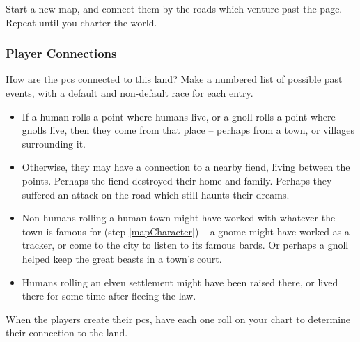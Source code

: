 \begin{multicols}{2}
\begin{itemize}
  Start a new map, and connect them by the roads which venture past the page.
  Repeat until you charter the world.
\end{itemize}

\bigLine

\subsubsection{Player Connections}

How are the \glspl{pc} connected to this land?
Make a numbered list of possible past events, with a default and non-default race for each entry.

\begin{itemize}
  \item
  If a human rolls a point where humans live, or a gnoll rolls a point where gnolls live, then they come from that place -- perhaps from a town, or \glspl{village} surrounding it.
  \item
  Otherwise, they may have a connection to a nearby fiend, living between the points.
  Perhaps the fiend destroyed their home and family.
  Perhaps they suffered an attack on the road which still haunts their dreams.
  \item
  Non-humans rolling a human town might have worked with whatever the town is famous for (step \vref{mapCharacter}) -- a gnome might have worked as a tracker, or come to the city to listen to its famous bards.
  Or perhaps a gnoll helped keep the great beasts in a town's \gls{court}.
  \item
  Humans rolling an elven settlement might have been raised there, or lived there for some time after fleeing the law.
\end{itemize}

When the players create their \glspl{pc}, have each one roll on your chart to determine their connection to the land.


\end{multicols}
